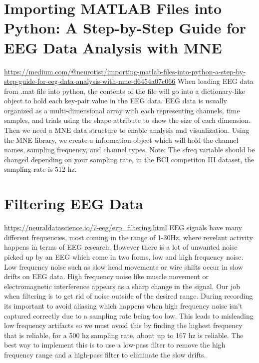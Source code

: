 \documentclass[12pt]{article}
\begin{document}
\section{Importing MATLAB Files into Python: A Step-by-Step Guide for EEG Data Analysis with MNE}
\url{https://medium.com/@neurotist/importing-matlab-files-into-python-a-step-by-step-guide-for-eeg-data-analysis-with-mne-d6454a07c066}
When loading EEG data from .mat file into python, the contents of the file will go into a dictionary-like object to hold each key-pair value in the EEG data. EEG data is usually organized as a multi-dimensional array with each representing channels, time samples, and trials using the shape attribute to show the size of each dimension. Then we need a MNE data structure to enable analysis and visualization. Using the MNE library, we create a information object which will hold the channel names, sampling frequency, and channel types. Note: The sfreq variable should be changed depending on your sampling rate, in the BCI competiton III dataset, the sampling rate is 512 hz. 

\section{Filtering EEG Data}
\url{https://neuraldatascience.io/7-eeg/erp_filtering.html}
EEG signals have many different frequencies, most coming in the range of 1-30Hz, where revelant activity happens in terms of EEG research. However there is a lot of unwanted noise picked up by an EEG which come in two forms, low and high frequency noise. Low frequency noise such as slow head movements or wire shifts occur in slow drifts on EEG data. High frequency noise like muscle movement or electromagnetic interference appears as a sharp change in the signal. Our job when filtering is to get rid of noise outside of the desired range. During recording its important to avoid aliasing which happens when high frequency noise isn't captured correctly due to a sampling rate being too low. This leads to misleading low frequency artifacts so we must avoid this by finding the highest frequency that is reliable, for a 500 hz sampling rate, about up to 167 hz is reliable. The best way to implement this is to use a low-pass filter to remove the high frequency range and a high-pass filter to eliminate the slow drifts. 
\end{document}
